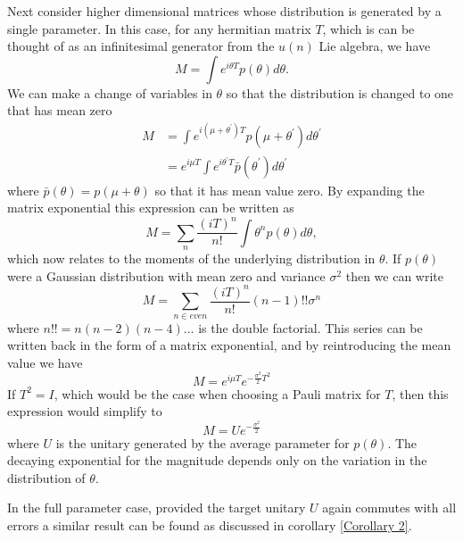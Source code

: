 \documentclass[aps,pra,twocolumn,superscriptaddress,numerical,floatfix]{revtex4-1}
\begin{document}
Next consider higher dimensional matrices whose distribution is generated by a single parameter.  In this case, for any hermitian matrix $T$, which is can be thought of as an infinitesimal generator from the $u(n)$ Lie algebra, we have
\begin{equation}
	M=\int e^{i\theta T}p(\theta)d\theta 
	\label{eq:single parameter, multi-mode}.
\end{equation}
We can make a change of variables in $\theta$ so that the distribution is changed to one that has mean zero
\begin{align}
	M&=\int e^{i(\mu + \theta^\prime)T} p(\mu + \theta^\prime) d\theta^\prime\\
	&= e^{i\mu T} \int e^{i\theta^\prime T} \bar{p}(\theta^\prime) d\theta^\prime
\end{align}
where $\bar{p}(\theta) = p(\mu + \theta)$ so that it has mean value zero.  By expanding the matrix exponential this expression can be written as
\begin{equation}
	M=\sum_n \frac{(iT)^n}{n!} \int \theta^n p(\theta) d\theta,
\end{equation}
which now relates to the moments of the underlying distribution in $\theta$. If $p(\theta)$ were a Gaussian distribution with mean zero and variance $\sigma^2$ then we can write
\begin{equation}
	M = \sum_{n \in even} \frac{(iT)^n}{n!} (n-1)!! \sigma^n
\end{equation}
where $n!! = n(n-2)(n-4)\dots$ is the double factorial.  This series can be written back in the form of a matrix exponential, and by reintroducing the mean value we have
\begin{equation}
	M = e^{i\mu T} e^{-\frac{\sigma^2}{2} T^2}
\end{equation}
If $T^2=I$, which would be the case when choosing a Pauli matrix for $T$, then this expression would simplify to
\begin{equation}
M=Ue^{-\frac{\sigma^2}{2}}  \label{eq:Gaussian Psuccess}
\end{equation}
where $U$ is the unitary generated by the average parameter for $p(\theta)$.  The decaying exponential for the magnitude depends only on the variation in the distribution of $\theta$.

In the full parameter case, provided the target unitary $U$ again commutes with all errors a similar result can be found as discussed in corollary \ref{Corollary 2}.
\end{document}
